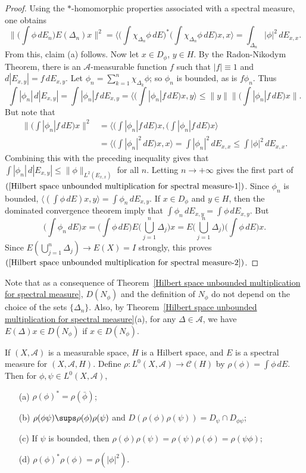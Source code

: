 \begin{proof}
Using the $*$-homomorphic properties associated with a spectral measure, one obtains
\[\Big\|\Big(\int\phi\,dE_n)E(\Delta_n)x\Big\|^2=\langle\Big(\int\chi_{\Delta_n}\phi\,dE\Big)^*\Big(\int\chi_{\Delta_n}\phi\,dE\Big)x,x\rangle=\int_{\Delta_n}|\phi|^2\,dE_{x,x}.\]
From this, claim (a) follows. Now let $x\in D_\phi$, $y\in H$. By the Radon-Nikodym Theorem, there is an $\mathcal{A}$-measurable function $f$ such that $|f|\equiv 1$ and $d|E_{x,y}|=f\,dE_{x,y}$. Let $\phi_n=\sum_{k=1}^{n}\chi_{\Delta_k}\phi$; so $\phi_n$ is bounded, as is $f\phi_n$. Thus
\[\int|\phi_n|\,d|E_{x,y}|=\int|\phi_n|f\,dE_{x,y}=\langle\Big(\int|\phi_n|f\,dE\Big)x,y\rangle\leq\|y\|\Big\|\Big(\int|\phi_n|f\,dE\Big)x\Big\|.\]
But note that
\begin{align*}
\Big\|\Big(\int|\phi_n|f\,dE\Big)x\Big\|^2&=\langle\Big(\int|\phi_n|f\,dE\Big)x,\Big(\int|\phi_n|f\,dE\Big)x\rangle\\
&=\langle\Big(\int|\phi_n|^2\,dE\Big)x,x\rangle=\int|\phi_n|^2\,dE_{x,x}\leq\int|\phi|^2\,dE_{x,x}.
\end{align*}
Combining this with the preceding inequality gives that $\int|\phi_n|\,d|E_{x,y}|\leq\|\phi\|_{L^2(E_{x,x})}$ for all $n$. Letting $n\to+\infty$ gives the first part of $(\ref{Hilbert space unbounded multiplication for spectral measure-1})$. Since $\phi_n$ is bounded, $\langle(\int\phi\,dE)x,y\rangle=\int\phi_n\,dE_{x,y}$. If $x\in D_\phi$ and $y\in H$, then the dominated convergence theorem imply that $\int\phi_n\,dE_{x,y}=\int\phi\,dE_{x,y}$. But
\[\Big(\int\phi_n\,dE\Big)x=\Big(\int\phi\,dE\Big)E\Big(\bigcup_{j=1}^{n}\Delta_j\Big)x=E\Big(\bigcup_{j=1}^{n}\Delta_j\Big)\Big(\int\phi\,dE\Big)x.\]
Since $E(\bigcup_{j=1}^{n}\Delta_j)\to E(X)=I$ strongly, this proves $(\ref{Hilbert space unbounded multiplication for spectral measure-2})$.
\end{proof}
Note that as a consequence of Theorem~\ref{Hilbert space unbounded multiplication for spectral measure}, $D(N_\phi)$ and the definition of $N_\phi$ do not depend on the choice of the sets $\{\Delta_n\}$. Also, by Theorem~\ref{Hilbert space unbounded multiplication for spectral measure}(a), for any $\Delta\in\mathcal{A}$, we have $E(\Delta)x\in D(N_\phi)$ if $x\in D(N_\phi)$.
\begin{theorem}
If $(X,\mathcal{A})$ is a measurable space, $H$ is a Hilbert space, and $E$ is a spectral measure for $(X,\mathcal{A},H)$. Define $\rho:L^0(X,\mathcal{A})\to\mathcal{C}(H)$ by $\rho(\phi)=\int\phi\,dE$. Then for $\phi,\psi\in L^0(X,\mathcal{A})$,
\begin{itemize}
\item[(a)] $\rho(\phi)^*=\rho(\bar{\phi})$;
\item[(b)] $\rho(\phi\psi)\sups\rho(\phi)\rho(\psi)$ and $D(\rho(\phi)\rho(\psi))=D_{\psi}\cap D_{\phi\psi}$;
\item[(c)]If $\psi$ is bounded, then $\rho(\phi)\rho(\psi)=\rho(\psi)\rho(\phi)=\rho(\psi\phi)$;
\item[(d)] $\rho(\phi)^*\rho(\phi)=\rho(|\phi|^2)$. 
\end{itemize}
\end{theorem}
